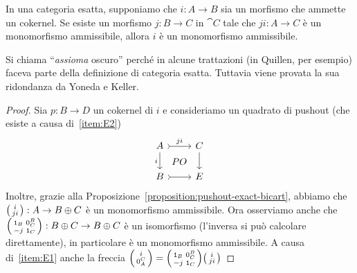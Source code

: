\begin{proposition}
  \label{proposition:ObscureAxiom}
  In una categoria esatta, supponiamo che \(i: A \to B\) sia un morfismo
  che ammette un cokernel. Se esiste un morfismo \(j: B \to C\) in
  \(\cat C\) tale che \(ji : A \to C\) è un monomorfismo ammissibile,
  allora \(i\) è un monomorfismo ammissibile.
\end{proposition}

\begin{remark}
  Si chiama ``{\em assioma} oscuro'' perché in alcune trattazioni (in
  Quillen, per esempio) faceva parte della definizione di categoria
  esatta. Tuttavia viene provata la sua ridondanza da Yoneda e Keller.
\end{remark}

\begin{proof}
  Sia \(p: B \to D\) un cokernel di \(i\) e consideriamo un quadrato di
  pushout (che esiste a causa di~\ref{item:E2})
  \[
    \begin{tikzcd}
      A \ar["{i}", d, swap] \ar["{PO}" description, phantom, dr]
      \ar["{ji}", rightarrowtail, r] & C \ar["{}", d] \\
      B \ar["{}", rightarrowtail, r] & E
    \end{tikzcd}
  \]
  Inoltre, grazie alla
  Proposizione~\ref{proposition:pushout-exact-bicart}, abbiamo che
  \(\begin{psmallmatrix} i \\ ji \end{psmallmatrix}: A \to B \oplus C\)
  è un monomorfismo ammissibile. Ora osserviamo anche che
  \(\begin{psmallmatrix} \mathtt 1_B & 0_C^B \\ -j & \mathtt 1_C \end{psmallmatrix}:
  B \oplus C \to B \oplus C\) è un isomorfismo (l'inversa si può
  calcolare direttamente), in particolare è un monomorfismo
  ammissibile. A causa di~\ref{item:E1} anche la freccia
  \(\begin{psmallmatrix} i \\ 0_A^C \end{psmallmatrix} =
  \begin{psmallmatrix}
    \mathtt 1_B & 0_C^B \\
    - j & \mathtt 1_C
  \end{psmallmatrix}
  \begin{psmallmatrix}
    i \\
    ji
  \end{psmallmatrix}\)

\end{proof}
